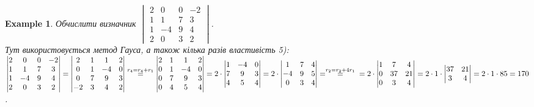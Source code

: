 \documentclass[a4paper, 10pt]{article}
\theoremstyle{theoremdd}
\newtheorem{example}[theorem]{Example}
\begin{document}
\begin{example}
Обчислити визначник $\begin{vmatrix}
2 & 0 & 0 & -2 \\
1 & 1 & 7 & 3 \\
1 & -4 & 9 & 4 \\
2 & 0 & 3 & 2
\end{vmatrix}$.\\
Тут використовується метод Гауса, а також кілька разів властивість 5):\\
$\begin{vmatrix}
2 & 0 & 0 & -2 \\
1 & 1 & 7 & 3 \\
1 & -4 & 9 & 4 \\
2 & 0 & 3 & 2
\end{vmatrix} = \begin{vmatrix}
2 & 1 & 1 & 2 \\
0 & 1 & -4 & 0 \\
0 & 7 & 9 & 3 \\
-2 & 3 & 4 & 2
\end{vmatrix} \overset{r_4 = r_4 + r_1}{=} \begin{vmatrix}
2 & 1 & 1 & 2 \\
0 & 1 & -4 & 0 \\
0 & 7 & 9 & 3 \\
0 & 4 & 5 & 4
\end{vmatrix} = 2 \cdot \begin{vmatrix}
1 & -4 & 0 \\
7 & 9 & 3 \\
4 & 5 & 4
\end{vmatrix} = 2 \cdot \begin{vmatrix}
1 & 7 & 4 \\
-4 & 9 & 5 \\
0 & 3 & 4
\end{vmatrix} = \overset{r_2 = r_2 + 4r_1}{=} \\ = 2 \cdot \begin{vmatrix}
1 & 7 & 4 \\
0 & 37 & 21 \\
0 & 3 & 4
\end{vmatrix} = 2 \cdot 1 \cdot \begin{vmatrix}
37 & 21 \\
3 & 4
\end{vmatrix} = 2 \cdot 1 \cdot 85 = 170$.
\end{example}
\end{document}
